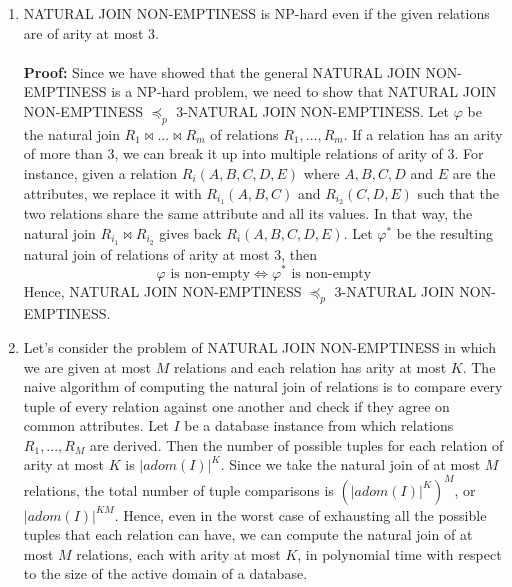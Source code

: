 \begin{enumerate}
  \item NATURAL JOIN NON-EMPTINESS is NP-hard even if the given relations 
  are of arity at most 3. \\ \\
  \textbf{Proof:} Since we have showed that the general NATURAL JOIN NON-EMPTINESS is a 
  NP-hard problem, we need to show that NATURAL JOIN NON-EMPTINESS $\preceq _{p}$ 3-NATURAL 
  JOIN NON-EMPTINESS. Let $\varphi$ be the natural join $R_1 \bowtie ... \bowtie 
  R_m$ of relations $R_1,...,R_m$. If a relation has an arity of more than 3, we can break it up 
  into multiple relations of arity of 3. For instance, given a relation $R_i(A,B,C,D,E)$ where 
  $A,B,C,D$ and $E$ are the attributes, we replace it with $R_{i_1}(A,B,C)$ and $R_{i_2}(C,D,E)$ 
  such that the two relations share the same attribute and all its values. In that way, the natural 
  join $R_{i_1} \bowtie R_{i_2}$ gives back $R_i(A,B,C,D,E)$. Let $\varphi ^*$ be the resulting 
  natural join of relations of arity at most 3, then 
  \begin{equation*}
    \varphi \text{ is non-empty} \Longleftrightarrow \varphi ^* \text{ is non-empty}
  \end{equation*} 
  Hence, NATURAL JOIN NON-EMPTINESS $\preceq _{p}$ 3-NATURAL JOIN NON-EMPTINESS.

  \item Let's consider the problem of NATURAL JOIN NON-EMPTINESS in which we are given at 
  most $M$ relations and each relation has arity at most $K$. The naive algorithm of 
  computing the natural join of relations is to compare every tuple of every relation against 
  one another and check if they agree on common attributes. Let $I$ be a database instance 
  from which relations $R_1,...,R_M$ are derived. Then the number of possible tuples 
  for each relation of arity at most $K$ is $|adom(I)|^K$. Since we take the natural join 
  of at most $M$ relations, the total number of tuple comparisons is $(|adom(I)|^K)^M$, or 
  $|adom(I)|^{KM}$. Hence, even in the worst case of exhausting all the possible tuples 
  that each relation can have, we can compute the natural join of at most $M$ relations, each with 
  arity at most $K$, in polynomial time with respect to the size of the active domain 
  of a database.
\end{enumerate}